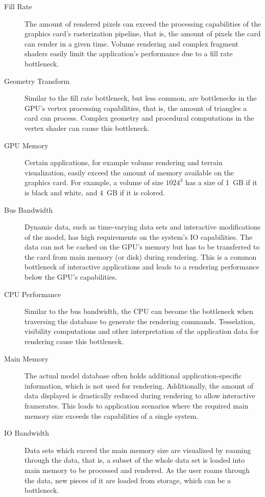 \documentclass[10pt,a4paper]{scrartcl}
\begin{document}
\begin{description}
\item[Fill Rate] The amount of rendered pixels can exceed the processing
  capabilities of the graphics card's rasterization pipeline, that
  is, the amount of pixels the card can render in a given time. Volume
  rendering and complex fragment shaders easily limit the application's
  performance due to a fill rate bottleneck.
\item[Geometry Transform] Similar to the fill rate bottleneck, but
  less common, are bottlenecks in the GPU's vertex processing
  capabilities, that is, the amount of triangles a card can
  process. Complex geometry and procedural computations in the vertex
  shader can cause this bottleneck.
\item[GPU Memory] Certain applications, for example volume rendering and
  terrain visualization, easily exceed the amount of memory available on
  the graphics card. For example, a volume of size $1024^3$ has a size
  of 1~GB if it is black and white, and 4~GB if it is colored.
\item[Bus Bandwidth] Dynamic data, such as time-varying data sets and
  interactive modifications of the model, has high requirements on
  the system's IO capabilities. The data can not be cached on the GPU's
  memory but has to be transferred to the card from main memory (or
  disk) during rendering. This is a common bottleneck of interactive
  applications and leads to a rendering performance below the GPU's
  capabilities.
\item[CPU Performance] Similar to the bus bandwidth, the CPU can become
  the bottleneck when traversing the database to generate the rendering
  commands. Tesselation, visibility computations and other
  interpretation of the application data for rendering cause this bottleneck.
\item[Main Memory] The actual model database often holds additional
  application-specific information, which is not used for
  rendering. Additionally, the amount of data displayed is drastically reduced
  during rendering to allow interactive framerates. This leads to
  application scenarios where the required main memory size exceeds the
  capabilities of a single system.
\item[IO Bandwidth] Data sets which exceed the main memory size are
  visualized by roaming through the data, that is, a subset of the whole
  data set is loaded into main memory to be processed and rendered. As
  the user roams through the data, new pieces of it are loaded from
  storage, which can be a bottleneck.
\end{description}
\end{document}
